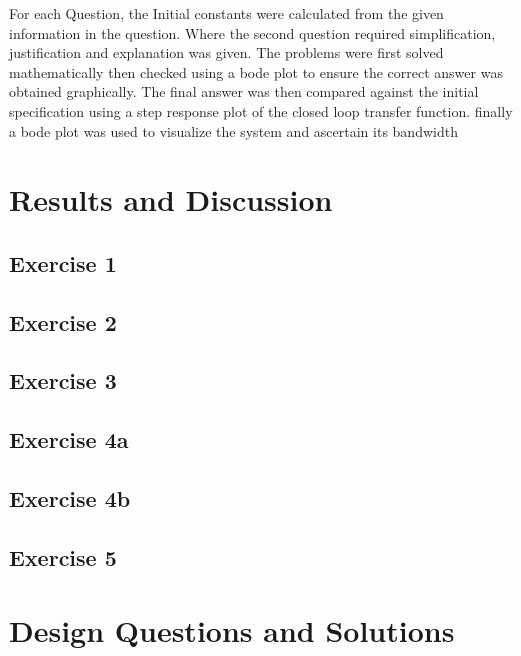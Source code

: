 \documentclass[12pt]{article}
\begin{document}
For each Question, the Initial constants were calculated from the given information in the question. Where the second question required simplification, justification and explanation was given. The problems were first solved mathematically then checked using a bode plot to ensure the correct answer was obtained graphically. The final answer was then compared against the initial specification using a step response plot of the closed loop transfer function. finally a bode plot was used to visualize the system and ascertain its bandwidth  \\






\pagebreak
\section{Results and Discussion}\label{sec:results}

\subsection{Exercise 1}\label{sec:ex1}

\subsection{Exercise 2}\label{sec:ex2}

\subsection{Exercise 3}\label{sec:ex3}

\subsection{Exercise 4a}\label{sec:ex4a}

\subsection{Exercise 4b}\label{sec:ex4b}

\subsection{Exercise 5}\label{sec:ex5}

\pagebreak

\section{Design Questions and Solutions}\label{sec:Q4}
\end{document}
